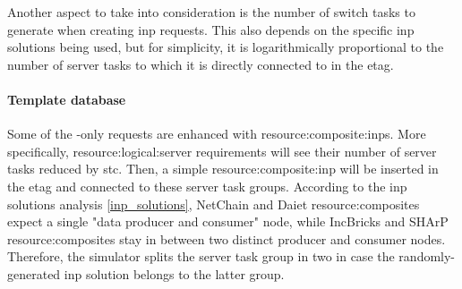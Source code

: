 Another aspect to take into consideration is the number of switch tasks to generate when creating \gls{inp} requests.
This also depends on the specific \gls{inp} solutions being used, but for simplicity, it is logarithmically proportional to the number of server tasks to which it is directly connected to in the \gls{etag}. %

\paragraph{Template database}
Some of the -only requests are enhanced with \glspl{resource:composite:inp}.
More specifically, \gls{resource:logical:server} requirements will see their number of server tasks reduced by \gls{stc}.
Then, a simple \gls{resource:composite:inp} will be inserted in the \gls{etag} and connected to these server task groups.
According to the \gls{inp} solutions analysis \autoref{inp_solutions}, NetChain \cite{netchain} and Daiet \cite{daiet} \glspl{resource:composite} expect a single "data producer and consumer" node, while IncBricks \cite{incbricks} and SHArP \cite{sharp} \glspl{resource:composite} stay in between two distinct producer and consumer nodes.
Therefore, the simulator splits the server task group in two in case the randomly-generated \gls{inp} solution belongs to the latter group.
